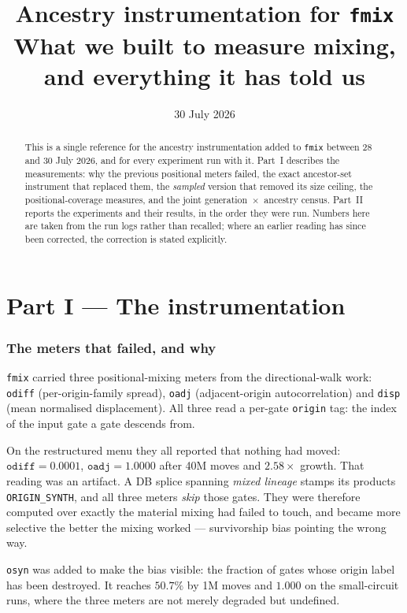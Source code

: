 \documentclass[11pt]{article}
\title{Ancestry instrumentation for \texttt{fmix}\\
\large What we built to measure mixing, and everything it has told us}
\date{30 July 2026}
\author{}
\begin{document}
\maketitle

\begin{abstract}
\noindent This is a single reference for the ancestry instrumentation added to
\texttt{fmix} between 28 and 30 July 2026, and for every experiment run with it.
Part~I describes the measurements: why the previous positional meters failed,
the exact ancestor-set instrument that replaced them, the \emph{sampled} version
that removed its size ceiling, the positional-coverage measures, and the joint
generation~$\times$~ancestry census. Part~II reports the experiments and their
results, in the order they were run. Numbers here are taken from the run logs
rather than recalled; where an earlier reading has since been corrected, the
correction is stated explicitly.
\end{abstract}

\tableofcontents

\part*{Part I --- The instrumentation}

\section{The meters that failed, and why}

\texttt{fmix} carried three positional-mixing meters from the directional-walk
work: \texttt{odiff} (per-origin-family spread), \texttt{oadj} (adjacent-origin
autocorrelation) and \texttt{disp} (mean normalised displacement). All three read
a per-gate \texttt{origin} tag: the index of the input gate a gate descends from.

On the restructured menu they all reported that nothing had moved:
$\texttt{odiff}=0.0001$, $\texttt{oadj}=1.0000$ after 40M moves and $2.58\times$
growth. That reading was an artifact. A DB splice spanning \emph{mixed lineage}
stamps its products \texttt{ORIGIN\_SYNTH}, and all three meters \emph{skip}
those gates. They were therefore computed over exactly the material mixing had
failed to touch, and became more selective the better the mixing worked ---
survivorship bias pointing the wrong way.

\texttt{osyn} was added to make the bias visible: the fraction of gates whose
origin label has been destroyed. It reaches $50.7\%$ by 1M moves and $1.000$ on
the small-circuit runs, where the three meters are not merely degraded but
undefined.
\end{document}
